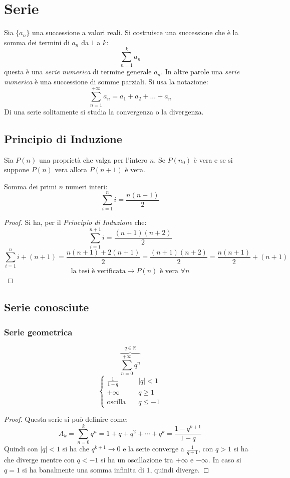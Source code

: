 \documentclass[a4paper,12pt, oneside]{book}
\begin{document}
\chapter{Serie} Sia $\{a_n\}$ una successione a valori reali. Si costruisce una
successione che è la somma dei termini di $a_n$ da $1$ a $k$:
$$\sum_{n=1}^{k}a_n$$
questa è una \textit{serie numerica} di termine generale $a_n$.  In altre parole
una \textit{serie numerica} è una successione di somme parziali. Si usa la
notazione:$$\sum_{n=1}^{+\infty} a_n = a_1+a_2+...+a_n$$ Di una serie
solitamente si studia la convergenza o la divergenza.
\begin{shaded}
  \section{Principio di Induzione} Sia $P(n)$ una proprietà che valga per
  l'intero $n$. Se $P(n_0)$ è vera e se si suppone $P(n)$ vera allora $P(n+1)$ è
  vera.\\
  \begin{esempio} Somma dei primi $n$ numeri interi:
    \begin{equation} \sum_{i=1}^{n} i=\frac{n(n+1)}{2}
    \end{equation}
    \begin{proof} Si ha, per il \textit{Principio di Induzione} che: $$
      \sum_{i=1}^{n+1} i= \frac{(n+1)(n+2)}{2}$$ $$ \sum_{i=1}^{n} i+(n+1) =
      \frac{n(n+1)+2(n+1)}{2}=\frac{(n+1)(n+2)}{2}= \frac{n(n+1)}{2}+(n+1)$$ $$\mbox{
        la tesi è verificata} \rightarrow P(n) \mbox{ è vera } \forall n$$
    \end{proof}
  \end{esempio}
\end{shaded}
\section{Serie conosciute}
\subsection{Serie geometrica}
$$\overbrace{\sum_{n=0}^{+\infty} q^{n}}^{q\in \mathbb{R}}$$
$$\left\{
  \begin{array}{ll} \frac{1}{1-q} & \mbox{ } |q|<1 \\ +\infty & \mbox{ } q\geq 1
    \\ \mbox{oscilla } & \mbox{ } q\leq -1
  \end{array} \right.$$
\begin{proof} Questa serie si può definire
  come:$$A_k=\sum_{n=0}^{k}q^n=1+q+q^2+\cdots+q^k=\frac{1-q^{k+1}}{1-q}$$ Quindi
  con $|q|<1$ si ha che $q^{k+1}\rightarrow 0$ e la serie converge a
  $\frac{1}{q+1}$, con $q>1$ si ha che diverge mentre con $q<-1$ si ha un
  oscillazione tra $+\infty$ e $-\infty$. In caso si $q=1$ si ha banalmente una
  somma infinita di $1$, quindi diverge.
\end{proof}
\newpage
\end{document}
